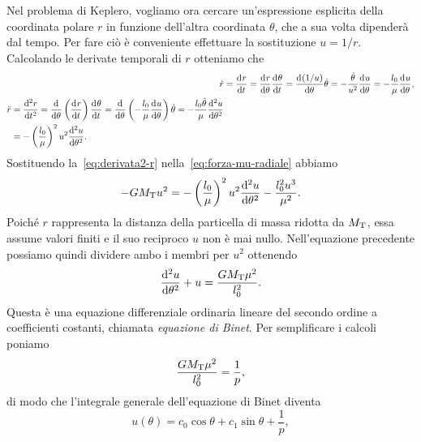 Nel problema di Keplero, vogliamo ora cercare un'espressione esplicita della
coordinata polare $r$ in funzione dell'altra coordinata $\theta$, che a sua
volta dipenderà dal tempo. Per fare ciò è conveniente effettuare la sostituzione
$u=1/r$. Calcolando le derivate temporali di $r$ otteniamo che
\begin{subequations}
  \begin{align}
    \dot{r} &= \toder{r}{t} = \toder{r}{\theta}\toder{\theta}{t} =
    \toder{(1/u)}{\theta}\dot{\theta} =
    -\frac{\dot{\theta}}{u^2}\toder{u}{\theta}
    = -\frac{l_0}{\mu}\toder{u}{\theta}, \label{eq:derivata1-r}\\
    \begin{split}
      \ddot{r} &= \toder[2]{r}{t} = \toder{}{\theta}
      \left( \toder{r}{t} \right)\toder{\theta}{t} = \toder{}{\theta}
      \left( -\frac{l_0}{\mu}\toder{u}{\theta} \right)\dot{\theta} =
      -\frac{l_0\dot{\theta}}{\mu}\toder[2]{u}{\theta} \\
      &= - \left( \frac{l_0}{\mu}
      \right)^2u^2\toder[2]{u}{\theta}. \label{eq:derivata2-r}
    \end{split}
  \end{align}
\end{subequations}
Sostituendo la~\eqref{eq:derivata2-r} nella~\eqref{eq:forza-mu-radiale} abbiamo
\begin{equation}
  -GM_\textup{T}u^2 = -
  \left(
    \frac{l_0}{\mu}
  \right)^2u^2\toder[2]{u}{\theta} - \frac{l_0^2u^3}{\mu^2}.
\end{equation}
Poiché $r$ rappresenta la distanza della particella di massa ridotta da
$M_\textup{T}$, essa assume valori finiti e il suo reciproco $u$ non è mai
nullo. Nell'equazione precedente possiamo quindi dividere ambo i membri per
$u^2$ ottenendo
\begin{equation}
  \toder[2]{u}{\theta} + u = \frac{GM_\textup{T}\mu^2}{l_0^2}.
\end{equation}
Questa è una equazione differenziale ordinaria lineare del secondo ordine a
coefficienti costanti, chiamata \emph{equazione di Binet}. Per semplificare i
calcoli poniamo
\begin{equation}
  \label{eq:reciproco-semilato}
  \frac{GM_\textup{T}\mu^2}{l_0^2} = \frac{1}{p},
\end{equation}
di modo che l'integrale generale dell'equazione di Binet diventa
\begin{equation}
  \label{eq:soluzione-binet}
  u(\theta) = c_0\cos\theta + c_1\sin\theta + \frac{1}{p},
\end{equation}

